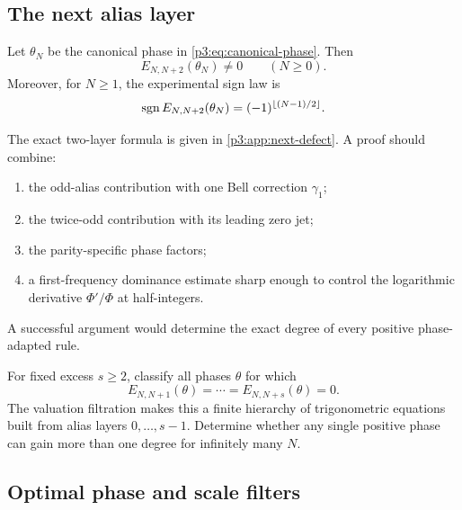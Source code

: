 \documentclass[11pt,oneside]{article}
\numberwithin{equation}{section}
\theoremstyle{definition}
\theoremstyle{remark}
\begin{document}
\subsection{The next alias layer}

\begin{conjecture}
\label{p3:conj:next-defect-sign}
Let $\theta_N$ be the canonical phase in \eqref{p3:eq:canonical-phase}.  Then
\begin{equation}
 E_{N,N+2}(\theta_N)\ne0
 \qquad(N\ge0).
 \label{p3:eq:next-defect-nonzero}
\end{equation}
Moreover, for $N\ge1$, the experimental sign law is
\begin{equation}
 \operatorname{sgn} E_{N,N+2}(\theta_N)
 =(-1)^{\left\lfloor(N-1)/2\right\rfloor}.
 \label{p3:eq:next-defect-sign-conj}
\end{equation}
\end{conjecture}

The exact two-layer formula is given in \cref{p3:app:next-defect}.  A proof should combine:
\begin{enumerate}
\item the odd-alias contribution with one Bell correction $\gamma_1$;
\item the twice-odd contribution with its leading zero jet;
\item the parity-specific phase factors;
\item a first-frequency dominance estimate sharp enough to control the logarithmic derivative $\Phi'/\Phi$ at half-integers.
\end{enumerate}
A successful argument would determine the exact degree of every positive phase-adapted rule.

\begin{problem}
\label{p3:prob:higher-phase-gains}
For fixed excess $s\ge2$, classify all phases $\theta$ for which
\[
 E_{N,N+1}(\theta)=\cdots=E_{N,N+s}(\theta)=0.
\]
The valuation filtration makes this a finite hierarchy of trigonometric equations built from alias layers $0,\ldots,s-1$.  Determine whether any single positive phase can gain more than one degree for infinitely many $N$.
\end{problem}

\subsection{Optimal phase and scale filters}
\end{document}
